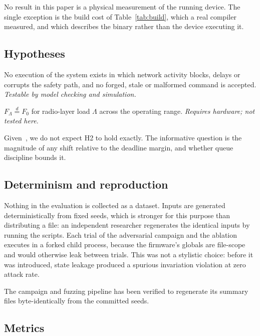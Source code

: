 \noindent No result in this paper is a physical measurement of the running device. The single
exception is the build cost of Table~\ref{tab:build}, which a real compiler measured, and
which describes the binary rather than the device executing it.

\subsection{Hypotheses}

\begin{description}[leftmargin=1.6em,itemsep=0.2em]
\item[H1 (logical isolation).] No execution of the system exists in which network activity
blocks, delays or corrupts the safety path, and no forged, stale or malformed command is
accepted. \emph{Testable by model checking and simulation.}
\item[H2 (timing isolation).] $F_{\Lambda} \stackrel{d}{=} F_{0}$ for radio-layer load $\Lambda$
across the operating range. \emph{Requires hardware; not tested here.}
\end{description}

Given~\cite{behnke2020}, we do not expect H2 to hold exactly. The informative question is the
magnitude of any shift relative to the deadline margin, and whether queue discipline bounds it.

\subsection{Determinism and reproduction}

Nothing in the evaluation is collected as a dataset. Inputs are generated deterministically from
fixed seeds, which is stronger for this purpose than distributing a file: an independent
researcher regenerates the identical inputs by running the scripts. Each trial of the adversarial
campaign and the ablation executes in a forked child process, because the firmware's globals are
file-scope and would otherwise leak between trials. This was not a stylistic choice: before it
was introduced, state leakage produced a spurious invariation violation at zero attack rate.

The campaign and fuzzing pipeline has been verified to regenerate its summary files
byte-identically from the committed seeds.

\subsection{Metrics}

